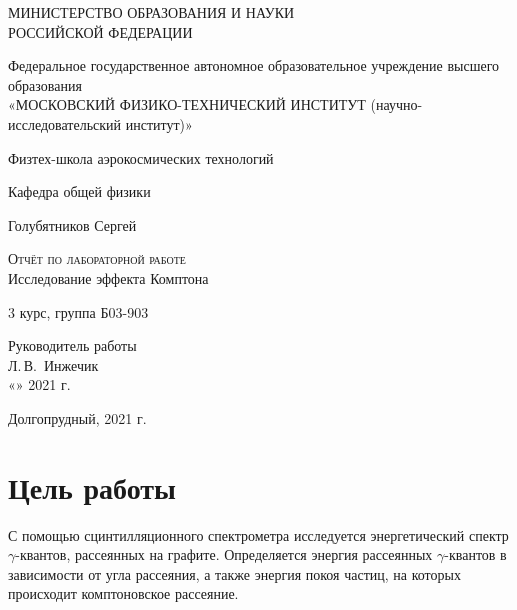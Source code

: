 \documentclass[14pt,a4paper]{scrartcl}
\begin{document}
\begin{titlepage}
  \begin{center}
    \large
    МИНИСТЕРСТВО ОБРАЗОВАНИЯ И НАУКИ\\ РОССИЙСКОЙ ФЕДЕРАЦИИ
     
    \vspace{0.5cm}
 
    Федеральное государственное автономное образовательное учреждение высшего образования \\ «МОСКОВСКИЙ ФИЗИКО-ТЕХНИЧЕСКИЙ ИНСТИТУТ (научно-исследовательский институт)»
    \vspace{0.25cm}

	Физтех-школа аэрокосмических технологий
     
    Кафедра общей физики
    \vfill
     
     

    Голубятников Сергей
    \vfill
 
    \textsc{Отчёт по лабораторной работе}\\[5mm]
     
    {\LARGE Исследование эффекта Комптона}
  \bigskip
     
   3 курс, группа Б03-903
\end{center}
\vfill
 
\newlength{\ML}
\hfill
\begin{minipage}{0.4\textwidth}
  Руководитель работы\\
  \underline{\hspace{\ML}} Л.\,В.~Инжечик\\
  «\underline{\hspace{0.7cm}}» \underline{\hspace{2cm}} 2021 г.
\end{minipage}%
\bigskip
 

\vfill
 
\begin{center}
  Долгопрудный, 2021 г.
\end{center}
\end{titlepage}


\tableofcontents
{}
\newpage


\section{Цель работы}
С помощью сцинтилляционного спектрометра исследуется энергетический спектр $\gamma$-квантов, рассеянных на графите. Определяется энергия рассеянных $\gamma$-квантов в зависимости от угла рассеяния, а также энергия покоя частиц, на которых происходит комптоновское рассеяние.
\end{document}
